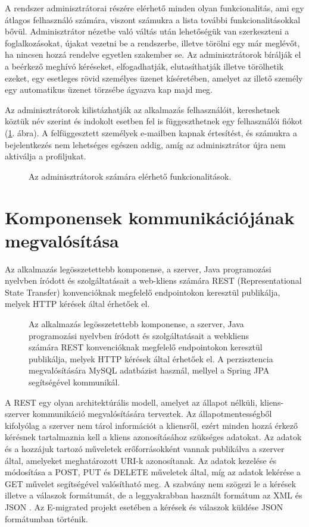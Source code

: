 A rendszer adminisztrátorai részére elérhető minden olyan funkcionalitás, ami egy átlagos felhasználó számára, viszont számukra a lista további funkcionalitásokkal bővül. Adminisztrátor nézetbe való váltás után lehetőségük van szerkeszteni a foglalkozásokat, újakat vezetni be a rendszerbe, illetve törölni egy már meglévőt, ha nincsen hozzá rendelve egyetlen szakember se. Az adminisztrátorok bírálják el a beérkező meghívó kéréseket, elfogadhatják, elutasíthatják illetve törölhetik ezeket, egy esetleges rövid személyes üzenet kíséretében, amelyet az illető személy egy automatikus üzenet törzsébe ágyazva kap majd meg. 

Az adminisztrátorok kilistázhatják az alkalmazás felhasználóit, kereshetnek köztük név szerint és indokolt esetben fel is függeszthetnek egy felhasználói fiókot (\ref{fig:admin_use_case}. ábra). A felfüggesztett személyek e-mailben kapnak értesítést, és számukra a bejelentkezés nem lehetséges egészen addig, amíg az adminisztrátor újra nem aktiválja a profiljukat. 

\begin{figure}
  \centering
  \caption{Az adminisztrátorok számára elérhető funkcionalitások.}
  \label{fig:admin_use_case}
\end{figure}

\section{Komponensek kommunikációjának megvalósítása}\label{sec:projektrol:kommunikacio}
Az alkalmazás legösszetettebb komponense, a szerver, Java programozási nyelvben íródott és szolgáltatásait a web-kliens számára REST (Representational State Transfer) \cite{REST} konvencióknak megfelelő endpointokon keresztül publikálja, melyek HTTP kérések által érhetőek el. 
\begin{figure}[!t]
  \centering
  \caption{Az alkalmazás legösszetettebb komponense, a szerver, Java programozási nyelvben íródott és szolgáltatásait a webkliens számára REST konvencióknak megfelelő endpointokon keresztül publikálja, melyek HTTP kérések által érhetőek el. A perzisztencia megvalósítására MySQL adatbázist használ, mellyel a Spring JPA segítségével kommunikál.}
  \label{fig:kommunikacio}
\end{figure}

A REST egy olyan architektúrális modell, amelyet az állapot nélküli, kliens-szerver kommunikáció megvalósítására terveztek. Az állapotmentességből kifolyólag a szerver nem tárol információt a kliensről, ezért minden hozzá érkező kérésnek tartalmaznia kell a kliens azonosításához szükséges adatokat. Az adatok és a hozzájuk tartozó műveletek erőforrásokként vannak publikálva a szerver által, amelyeket meghatározott URI-k azonosítanak. Az adatok kezelése és módosítása a POST, PUT és DELETE műveletek által, míg az adatok lekérése a GET művelet segítségével valósítható meg. A szabvány nem szögezi le a kérések illetve a válaszok formátumát, de a leggyakrabban használt formátum az XML és JSON \cite{REST}. Az E-migrated projekt esetében a kérések és válaszok küldése JSON formátumban történik.  

